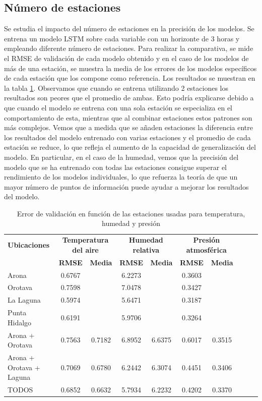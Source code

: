 \subsection{Número de estaciones}
Se estudia el impacto del número de estaciones en la precisión de los modelos. Se entrena un modelo LSTM sobre cada variable con un horizonte de 3 horas y empleando diferente número de estaciones.
Para realizar la comparativa, se mide el RMSE de validación de cada modelo obtenido y en el caso de los modelos de más de una estación, se muestra la media de los errores de los modelos específicos de cada
estación que los compone como referencia. Los resultados se muestran en la tabla \ref{estaciones_y_error}. Observamos que cuando se entrena utilizando 2 estaciones los resultados son peores que el promedio de ambas.
Esto podría explicarse debido a que cuando el modelo se entrena con una sola estación se especializa en el comportamiento de esta, mientras que al combinar estaciones estos patrones son más complejos.
Vemos que a medida que se añaden estaciones la diferencia entre los resultados del modelo entrenado con varias estaciones y el promedio de cada estación se reduce, lo que refleja el aumento de la capacidad de generalización del modelo.
En particular, en el caso de la humedad, vemos que la precisión del modelo que se ha entrenado con todas las estaciones consigue superar el rendimiento de los modelos individuales, lo que refuerza la teoría de que 
un mayor número de puntos de información puede ayudar a mejorar los resultados del modelo.

\begin{table}[h!]
\centering
\begin{tabular}{lccccccccc}
\toprule
\textbf{Ubicaciones} & \multicolumn{2}{c}{\textbf{Temperatura del aire}} & \multicolumn{2}{c}{\textbf{Humedad relativa}} & \multicolumn{2}{c}{\textbf{Presión atmosférica}} \\
\cmidrule(lr){2-3} \cmidrule(lr){4-5} \cmidrule(lr){6-7}
& \textbf{RMSE} & \textbf{Media} & \textbf{RMSE} & \textbf{Media} & \textbf{RMSE} & \textbf{Media} \\
\midrule
Arona                    & 0.6767 &         & 6.2273 &        &  0.3603 &        \\
Orotava                  & 0.7598 &         & 7.0478 &        &  0.3427  &        \\
La Laguna                & 0.5974 &         & 5.6471 &        &  0.3187 &        \\
Punta Hidalgo            & 0.6191 &         & 5.9706 &        &  0.3264 &        \\
Arona + Orotava          & 0.7563 & 0.7182 & 6.8952 & 6.6375 &  0.6017 &  0.3515 \\
Arona + Orotava + Laguna & 0.7069 & 0.6780 & 6.2442 & 6.3074 & 0.4451 & 0.3406 \\
TODOS                    & 0.6852 & 0.6632 & 5.7934 & 6.2232 & 0.4202 & 0.3370 \\
\bottomrule
\end{tabular}
\caption{Error de validación en función de las estaciones usadas para temperatura, humedad y presión}
\label{estaciones_y_error}
\end{table}


